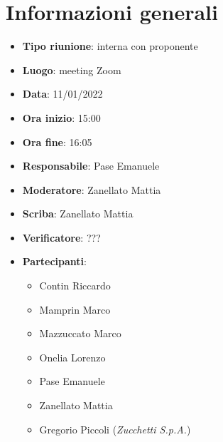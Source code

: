 \section{Informazioni generali}
\begin{itemize}
  \item \textbf{Tipo riunione}: interna con proponente
  \item \textbf{Luogo}: meeting Zoom
  \item \textbf{Data}: 11/01/2022
  \item \textbf{Ora inizio}: 15:00
  \item \textbf{Ora fine}: 16:05
  \item \textbf{Responsabile}: Pase Emanuele
  \item \textbf{Moderatore}: Zanellato Mattia
  \item \textbf{Scriba}: Zanellato Mattia
  \item \textbf{Verificatore}: ???
  \item \textbf{Partecipanti}:
  \begin{itemize}
    \item Contin Riccardo
    \item Mamprin Marco
    \item Mazzuccato Marco
    \item Onelia Lorenzo
    \item Pase Emanuele
    \item Zanellato Mattia
    \item Gregorio Piccoli (\textit{Zucchetti S.p.A.})
  \end{itemize}
\end{itemize}
